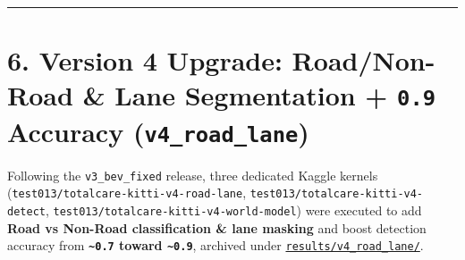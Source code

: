 \documentclass[10.5pt,a4paper]{article}
\begin{document}
\par\noindent\rule{\textwidth}{0.4pt}\par\medskip

\section{6. Version 4 Upgrade: Road/Non-Road \& Lane Segmentation + \texttt{0.\allowbreak{}9} Accuracy (\texttt{v4\_\allowbreak{}road\_\allowbreak{}lane})}

Following the \texttt{v3\_\allowbreak{}bev\_\allowbreak{}fixed} release, three dedicated Kaggle kernels (\texttt{test013/\allowbreak{}totalcare-\allowbreak{}kitti-\allowbreak{}v4-\allowbreak{}road-\allowbreak{}lane}, \texttt{test013/\allowbreak{}totalcare-\allowbreak{}kitti-\allowbreak{}v4-\allowbreak{}detect}, \texttt{test013/\allowbreak{}totalcare-\allowbreak{}kitti-\allowbreak{}v4-\allowbreak{}world-\allowbreak{}model}) were executed to add \textbf{Road vs Non-Road classification \& lane masking} and boost detection accuracy from \textbf{\texttt{\textasciitilde{}0.\allowbreak{}7} toward \texttt{\textasciitilde{}0.\allowbreak{}9}}, archived under \href{https://github.com/Heisnotanimposter/Totalcare\_autonomous\_driving\_Yolov5/tree/main/results/v4\_road\_lane/}{\texttt{results/\allowbreak{}v4\_\allowbreak{}road\_\allowbreak{}lane/\allowbreak{}}}.
\end{document}
